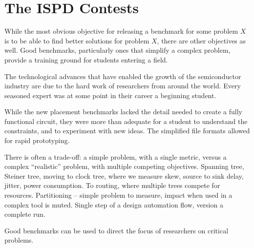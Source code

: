 \documentclass[sigconf]{acmart}
\begin{document}
\section{The ISPD Contests}


While the most obvious objective for releasing a benchmark for some
problem $X$ is to be able to find better solutions for problem $X$,
there are other objectives as well.  Good benchmarks, particularly
ones that simplify a complex problem, provide a training ground for
students entering a field.

The technological advances that
have enabled the growth of the semiconductor industry
are due to the hard work of researchers from around the
world.  Every seasoned expert was at some point in their
career a beginning student.

While the new placement benchmarks lacked the detail needed
to create a fully functional circuit, they were more than
adequate for a student to understand the constraints, and
to experiment with new ideas.  The simplified file formats
allowed for rapid prototyping.

There is often a trade-off:
a simple problem, with a single metric, versus
a complex ``realistic'' problem, with multiple competing
objectives.  Spanning tree, Steiner tree, moving to clock
tree, where we measure skew, source to sink delay, jitter,
power consumption.  To routing, where multiple trees compete
for resources.
Partitioning -- simple problem to measure, impact when used
in a complex tool is muted.  Single step of a design automation
flow, version a complete run.

Good benchmarks can be used to direct the focus of researchers
on critical problems.


\iffalse
Secondary objectives.  Training ground for new students
entering the field -- a way to build understanding.  Simplified
construction of tools, lower time and effort required to
experiment with new ideas.
\fi

\end{document}

